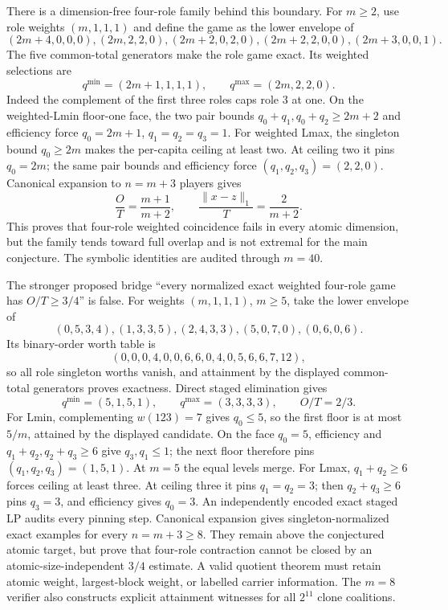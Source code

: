 \documentclass[11pt]{article}
\begin{document}
There is a dimension-free four-role family behind this boundary.  For
$m\ge2$, use role weights $(m,1,1,1)$ and define the game as the lower envelope
of
\[
 (2m+4,0,0,0), (2m,2,2,0), (2m+2,0,2,0),
 (2m+2,2,0,0), (2m+3,0,0,1).                       \tag{W4F1}
\]
The five common-total generators make the role game exact.  Its weighted
selections are
\[
 q^{\min}=(2m+1,1,1,1),\qquad q^{\max}=(2m,2,2,0).  \tag{W4F2}
\]
Indeed the complement of the first three roles caps role $3$ at one.  On the
weighted-Lmin floor-one face, the two pair bounds
$q_0+q_1,q_0+q_2\ge2m+2$ and efficiency force
$q_0=2m+1$, $q_1=q_2=q_3=1$.  For weighted Lmax, the singleton bound
$q_0\ge2m$ makes the per-capita ceiling at least two.  At ceiling two it pins
$q_0=2m$; the same pair bounds and efficiency force $(q_1,q_2,q_3)=(2,2,0)$.
Canonical expansion to $n=m+3$ players gives
\[
 \frac OT=\frac{m+1}{m+2},\qquad
 \frac{\lVert x-z\rVert_1}{T}=\frac{2}{m+2}.         \tag{W4F3}
\]
This proves that four-role weighted coincidence fails in every atomic
dimension, but the family tends toward full overlap and is not extremal for
the main conjecture.  The symbolic identities are audited through $m=40$.

The stronger proposed bridge ``every normalized exact weighted four-role
game has $O/T\ge3/4$'' is false.  For weights $(m,1,1,1)$, $m\ge5$, take the
lower envelope of
\[
 (0,5,3,4),(1,3,3,5),(2,4,3,3),(5,0,7,0),(0,6,0,6).             \tag{W4N1}
\]
Its binary-order worth table is
\[
 (0,0,0,4,0,0,6,6,0,4,0,5,6,6,7,12),                          \tag{W4N2}
\]
so all role singleton worths vanish, and attainment by the displayed
common-total generators proves exactness.  Direct staged elimination gives
\[
 q^{\min}=(5,1,5,1),\qquad q^{\max}=(3,3,3,3),\qquad O/T=2/3.   \tag{W4N3}
\]
For Lmin, complementing $w(123)=7$ gives $q_0\le5$, so the first floor is at
most $5/m$, attained by the displayed candidate.  On the face $q_0=5$,
efficiency and $q_1+q_2,q_2+q_3\ge6$ give $q_3,q_1\le1$; the next floor
therefore pins $(q_1,q_2,q_3)=(1,5,1)$.  At $m=5$ the equal levels merge.
For Lmax, $q_1+q_2\ge6$ forces ceiling at least three.  At ceiling three it
pins $q_1=q_2=3$; then $q_2+q_3\ge6$ pins $q_3=3$, and efficiency gives
$q_0=3$.
An independently encoded exact staged LP audits every pinning step.
Canonical expansion gives singleton-normalized exact examples for every
$n=m+3\ge8$.  They remain above the conjectured atomic target, but prove that
four-role contraction cannot be closed by an atomic-size-independent
$3/4$ estimate.  A valid quotient theorem must retain atomic weight,
largest-block weight, or labelled carrier information.  The $m=8$ verifier
also constructs explicit attainment witnesses for all $2^{11}$ clone
coalitions.
\end{document}
